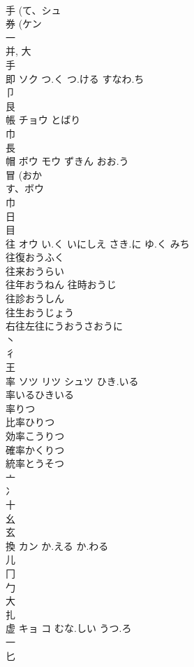 \documentclass[8pt]{extreport}
\begin{document}
\begin{CJK}{UTF8}{min}
\\	手 (て、シュ 
\\	券 (ケン 
\\	一 
\\	并, 大 
\\	手 
\\	即	ソク	つ.く つ.ける すなわ.ち	
\\	卩 
\\	艮 
\\	帳	チョウ	とばり	
\\	巾 
\\	長 
\\	帽	ボウ モウ	ずきん おお.う	
\\	冒 (おか
\\	す、ボウ 
\\	巾 
\\	日 
\\	目 
\\	往	オウ	い.く いにしえ さき.に ゆ.く みち	
\\	往復おうふく 
\\	往来おうらい 
\\	往年おうねん 往時おうじ 
\\	往診おうしん 
\\	往生おうじょう 
\\	右往左往にうおうさおうに 
\\	丶 
\\	彳 
\\	王 
\\	率	ソツ リツ シュツ	ひき.いる	
\\	率いるひきいる
\\	率りつ
\\	比率ひりつ
\\	効率こうりつ
\\	確率かくりつ
\\	統率とうそつ
\\	亠 
\\	冫 
\\	十 
\\	幺 
\\	玄 
\\	換	カン	か.える か.わる	
\\	儿 
\\	冂 
\\	勹 
\\	大 
\\	扎	
\\	虚	キョ コ	むな.しい うつ.ろ	
\\	一 
\\	匕 

\end{CJK}
\end{document}

